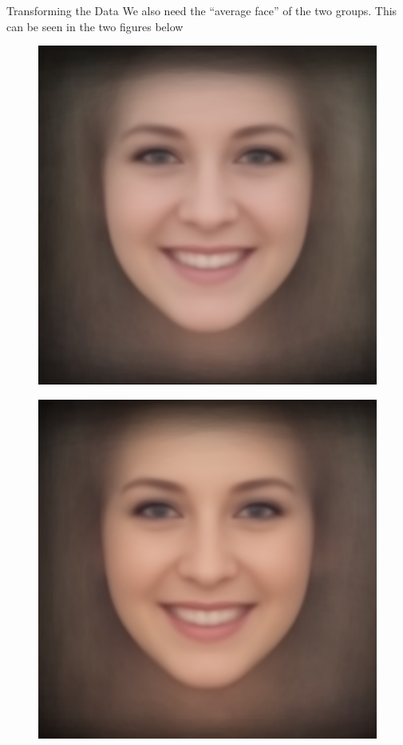 \documentclass[final]{beamer}
\newlength{\onecolwid}
\begin{document}
\begin{frame}[t]
\begin{columns}[t]
\begin{column}{\onecolwid}
\begin{block}{Transforming the Data}
We also need the ``average face'' of the two groups. This can be seen in the two figures below

\begin{figure}
\centering
\begin{minipage}{.5\textwidth}
  \centering
  \includegraphics[width=.85\linewidth]{../data/Provo_avg.jpg}
  \label{fig:mo}
\end{minipage}%
\begin{minipage}{.5\textwidth}
  \centering
  \includegraphics[width=.85\linewidth]{../data/Seattle_avg.jpg}
  \label{fig:non_mo}
\end{minipage}
\end{figure}


\end{block}
\end{column}
\end{columns}
\end{frame}
\end{document}
